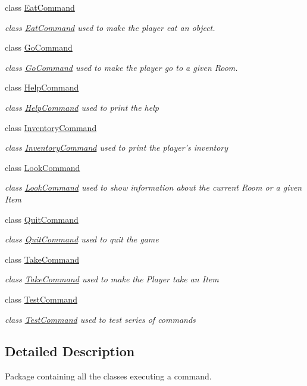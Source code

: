 \begin{DoxyCompactItemize}
class \hyperlink{classpkg__commands_1_1EatCommand}{Eat\-Command}
\begin{DoxyCompactList}\small\item\em class \hyperlink{classpkg__commands_1_1EatCommand}{Eat\-Command} used to make the player eat an object. \end{DoxyCompactList}\item 
class \hyperlink{classpkg__commands_1_1GoCommand}{Go\-Command}
\begin{DoxyCompactList}\small\item\em class \hyperlink{classpkg__commands_1_1GoCommand}{Go\-Command} used to make the player go to a given Room. \end{DoxyCompactList}\item 
class \hyperlink{classpkg__commands_1_1HelpCommand}{Help\-Command}
\begin{DoxyCompactList}\small\item\em class \hyperlink{classpkg__commands_1_1HelpCommand}{Help\-Command} used to print the help \end{DoxyCompactList}\item 
class \hyperlink{classpkg__commands_1_1InventoryCommand}{Inventory\-Command}
\begin{DoxyCompactList}\small\item\em class \hyperlink{classpkg__commands_1_1InventoryCommand}{Inventory\-Command} used to print the player's inventory \end{DoxyCompactList}\item 
class \hyperlink{classpkg__commands_1_1LookCommand}{Look\-Command}
\begin{DoxyCompactList}\small\item\em class \hyperlink{classpkg__commands_1_1LookCommand}{Look\-Command} used to show information about the current Room or a given Item \end{DoxyCompactList}\item 
class \hyperlink{classpkg__commands_1_1QuitCommand}{Quit\-Command}
\begin{DoxyCompactList}\small\item\em class \hyperlink{classpkg__commands_1_1QuitCommand}{Quit\-Command} used to quit the game \end{DoxyCompactList}\item 
class \hyperlink{classpkg__commands_1_1TakeCommand}{Take\-Command}
\begin{DoxyCompactList}\small\item\em class \hyperlink{classpkg__commands_1_1TakeCommand}{Take\-Command} used to make the Player take an Item \end{DoxyCompactList}\item 
class \hyperlink{classpkg__commands_1_1TestCommand}{Test\-Command}
\begin{DoxyCompactList}\small\item\em class \hyperlink{classpkg__commands_1_1TestCommand}{Test\-Command} used to test series of commands \end{DoxyCompactList}\end{DoxyCompactItemize}


\subsection{Detailed Description}
Package containing all the classes executing a command. 